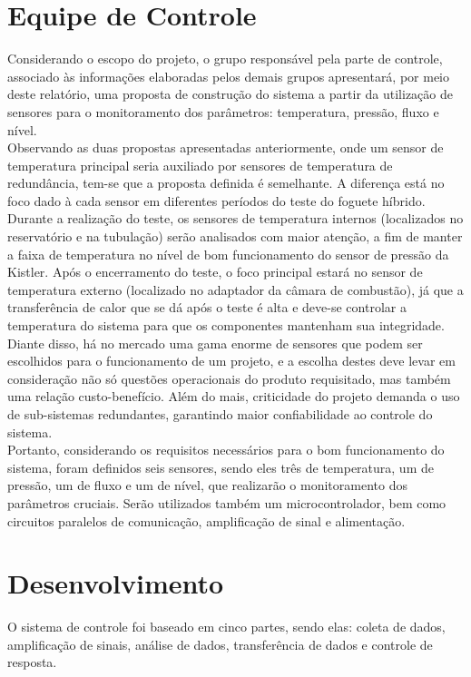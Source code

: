 \newpage\section{Equipe de Controle}
Considerando o escopo do projeto, o grupo responsável pela parte de controle, associado às informações elaboradas pelos demais grupos apresentará, por meio deste relatório, uma proposta de construção do sistema a partir da utilização de sensores para o monitoramento dos parâmetros: temperatura, pressão, fluxo e nível.\\
Observando as duas propostas apresentadas anteriormente, onde um sensor de temperatura principal seria auxiliado por sensores de temperatura de redundância, tem-se que a proposta definida é semelhante. A diferença está no foco dado à cada sensor em diferentes períodos do teste do foguete híbrido. Durante a realização do teste, os sensores de temperatura internos (localizados no reservatório e na tubulação) serão analisados com maior atenção, a fim de manter a faixa de temperatura no nível de bom funcionamento do sensor de pressão da Kistler. Após o encerramento do teste, o foco principal estará no sensor de temperatura externo (localizado no adaptador da câmara de combustão), já que a transferência de calor que se dá após o teste é alta e deve-se controlar a temperatura do sistema para que os componentes mantenham sua integridade.\\
Diante disso, há no mercado uma gama enorme de sensores que podem ser escolhidos para o funcionamento de um projeto, e a escolha destes deve levar em consideração não só questões operacionais do produto requisitado, mas também uma relação custo-benefício. Além do mais, criticidade do projeto demanda o uso de sub-sistemas redundantes, garantindo maior confiabilidade ao controle do sistema.\\
Portanto, considerando os requisitos necessários para o bom funcionamento do sistema, foram definidos seis sensores, sendo eles três de temperatura, um de pressão, um de fluxo e um de nível, que realizarão o monitoramento dos parâmetros cruciais. Serão utilizados também um microcontrolador, bem como circuitos paralelos de comunicação, amplificação de sinal e alimentação.\\
\section{Desenvolvimento}
O sistema de controle foi baseado em cinco partes, sendo elas: coleta de dados, amplificação de sinais, análise de dados, transferência de dados e controle de resposta.
